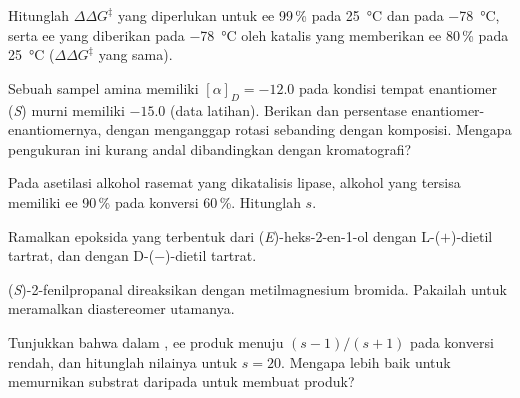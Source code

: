 \begin{exercise}[$\star\star$]\label{exo:b3:asymmetric-synthesis:5}
Hitunglah $\Delta\Delta G^\ddagger$ yang diperlukan untuk ee 99\,\% pada \qty{25}{\celsius} dan pada \qty{-78}{\celsius}, serta ee yang diberikan pada \qty{-78}{\celsius}
oleh katalis yang memberikan ee 80\,\% pada \qty{25}{\celsius} ($\Delta\Delta G^\ddagger$ yang sama).
\end{exercise}

\begin{exercise}[$\star\star$]\label{exo:b3:asymmetric-synthesis:6}
Sebuah sampel amina memiliki $[\alpha]_D = -12.0$ pada kondisi tempat enantiomer (\textit{S})
murni memiliki $-15.0$ (data latihan). Berikan  dan
persentase enantiomer-enantiomernya, dengan menganggap rotasi sebanding dengan komposisi.
Mengapa pengukuran ini kurang andal dibandingkan dengan kromatografi?
\end{exercise}

\begin{exercise}[$\star\star$]\label{exo:b3:asymmetric-synthesis:7}
Pada asetilasi alkohol rasemat yang dikatalisis lipase, alkohol yang tersisa
memiliki ee 90\,\% pada konversi 60\,\%. Hitunglah $s$.
\end{exercise}

\begin{exercise}[$\star\star$]\label{exo:b3:asymmetric-synthesis:8}
Ramalkan epoksida yang terbentuk dari (\textit{E})-heks-2-en-1-ol dengan L-($+$)-dietil tartrat, dan dengan
D-($-$)-dietil tartrat.
\end{exercise}

\begin{exercise}[$\star\star$]\label{exo:b3:asymmetric-synthesis:9}
(\textit{S})-2-fenilpropanal direaksikan dengan metilmagnesium bromida. Pakailah 
untuk meramalkan diastereomer utamanya.
\end{exercise}

\begin{exercise}[$\star\star\star$]\label{exo:b3:asymmetric-synthesis:10}
Tunjukkan bahwa dalam , ee produk menuju $(s - 1)/(s + 1)$ pada konversi
rendah, dan hitunglah nilainya untuk $s = 20$. Mengapa  lebih baik untuk memurnikan
substrat daripada untuk membuat produk?
\end{exercise}

